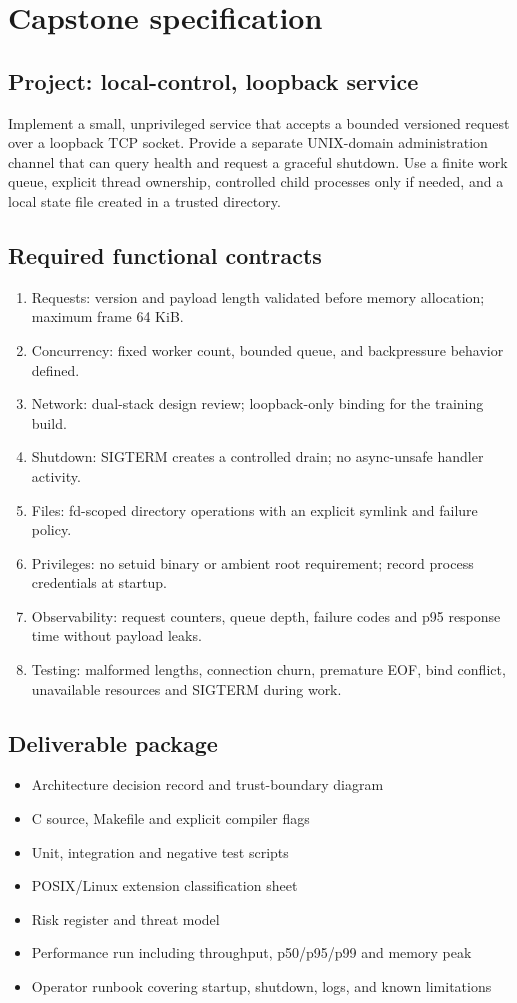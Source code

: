 \documentclass[11pt,letterpaper,oneside]{report}
\begin{document}
\chapter{Capstone specification}
\section{Project: local-control, loopback service}
Implement a small, unprivileged service that accepts a bounded versioned request over a loopback TCP socket. Provide a separate UNIX-domain administration channel that can query health and request a graceful shutdown. Use a finite work queue, explicit thread ownership, controlled child processes only if needed, and a local state file created in a trusted directory.

\section{Required functional contracts}
\begin{enumerate}
\item Requests: version and payload length validated before memory allocation; maximum frame 64 KiB.
\item Concurrency: fixed worker count, bounded queue, and backpressure behavior defined.
\item Network: dual-stack design review; loopback-only binding for the training build.
\item Shutdown: SIGTERM creates a controlled drain; no async-unsafe handler activity.
\item Files: fd-scoped directory operations with an explicit symlink and failure policy.
\item Privileges: no setuid binary or ambient root requirement; record process credentials at startup.
\item Observability: request counters, queue depth, failure codes and p95 response time without payload leaks.
\item Testing: malformed lengths, connection churn, premature EOF, bind conflict, unavailable resources and SIGTERM during work.
\end{enumerate}
\section{Deliverable package}
\begin{itemize}
\item Architecture decision record and trust-boundary diagram
\item C source, Makefile and explicit compiler flags
\item Unit, integration and negative test scripts
\item POSIX/Linux extension classification sheet
\item Risk register and threat model
\item Performance run including throughput, p50/p95/p99 and memory peak
\item Operator runbook covering startup, shutdown, logs, and known limitations
\end{itemize}
\end{document}
